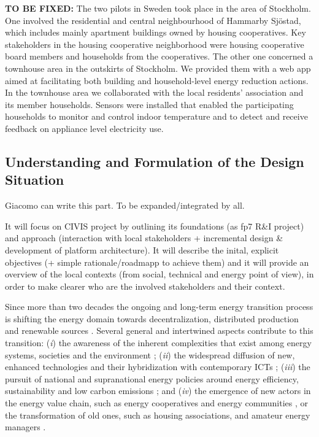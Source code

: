 \textbf{TO BE FIXED:} The two pilots in Sweden took place in the area of Stockholm. One involved the residential and central neighbourhood
of Hammarby Sj\"{o}stad, which includes mainly apartment buildings owned by housing cooperatives. Key stakeholders in the
housing cooperative neighborhood were housing cooperative board members and households from the cooperatives. The other
one concerned a townhouse area in the outskirts of Stockholm.  We provided them with a web app aimed at facilitating both
building and household-level energy reduction actions. In the townhouse area we collaborated with the local residents’ association
and its member households. Sensors were installed that enabled the participating households to monitor and control indoor
temperature and to detect and receive feedback on appliance level electricity use.

\subsection{Understanding and Formulation of the Design Situation}
\begin{svgraybox}
[note by GP] Giacomo can write this part. To be expanded/integrated by all.

It will focus on CIVIS project by outlining its foundations (as fp7 R\&I project) and approach (interaction with local stakeholders + incremental design \& development of platform architecture). It will describe the inital, explicit objectives (+ simple rationale/roadmapp to achieve them) and it will provide an overview of the local contexts (from social, technical and energy point of view), in order to make clearer who are the involved stakeholders and their context.
\end{svgraybox}

Since more than two decades the ongoing and long-term energy transition process is shifting the energy domain
towards decentralization, distributed production and renewable sources \cite{rifkin_third_2011; sovacool_how_2016}.
Several general and intertwined aspects contribute to this transition: (\textit{i}) the awareness of the inherent complexities
that exist among energy systems, societies and the environment \cite{bulkeley_bringing_2012; umbach_global_2010}; (\textit{ii}) the
widespread diffusion of new, enhanced technologies and their hybridization with contemporary ICTs \cite{putrus_smart_2013; schick_innovating_2013};
(\textit{iii}) the pursuit of national and supranational energy policies around energy efficiency, sustainability and low carbon emissions \cite{da_graca_carvalho_eu_2012};
and (\textit{iv}) the emergence of new actors in the energy value chain, such as energy cooperatives and
energy communities \cite{viardot_role_2013}, or the transformation of old ones, such as housing associations,
and amateur energy managers \cite{hasselqvist_linking_2016}.



